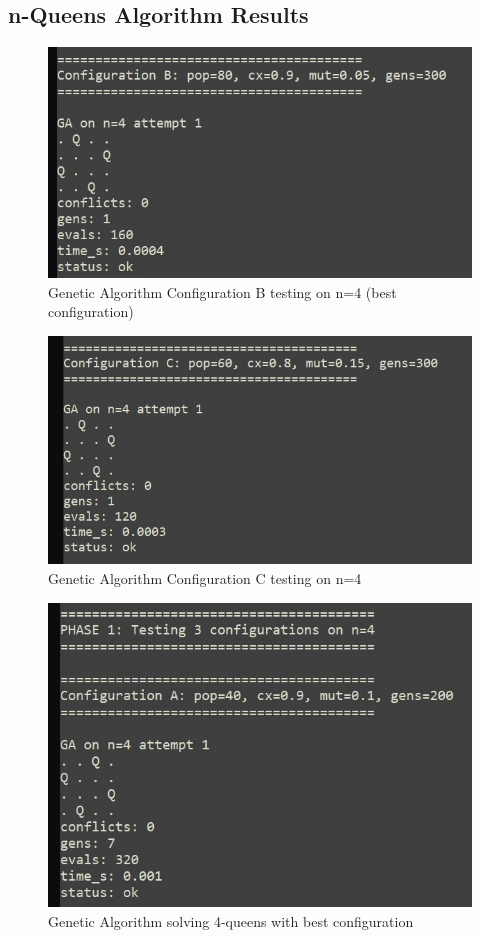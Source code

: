 \documentclass[letterpaper]{article}
\begin{document}
\subsection{n-Queens Algorithm Results}

\begin{figure}[h]
\centering
\includegraphics[width=0.85\columnwidth]{queens_ga_config_b.jpg}
\caption{Genetic Algorithm Configuration B testing on n=4 (best configuration)}
\end{figure}

\begin{figure}[h]
\centering
\includegraphics[width=0.85\columnwidth]{queens_ga_config_c.jpg}
\caption{Genetic Algorithm Configuration C testing on n=4}
\end{figure}

\begin{figure}[h]
\centering
\includegraphics[width=0.85\columnwidth]{queens_ga_n4.jpg}
\caption{Genetic Algorithm solving 4-queens with best configuration}
\end{figure}
\end{document}
